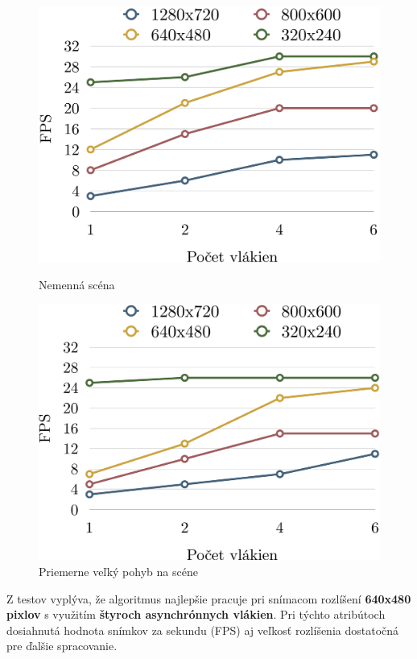 \begin{figure}[H]
  \centering
  \begin{minipage}[b]{0.49\textwidth}
    \includegraphics[width=\textwidth]{images/substractorCalm}
    \caption{Nemenná scéna}
  \end{minipage}
  \hfill
  \begin{minipage}[b]{0.49\textwidth}
    \includegraphics[width=\textwidth]{images/substractorNormal}
    \caption{Priemerne veľký pohyb na scéne}
  \end{minipage}
\end{figure}

Z testov vyplýva, že algoritmus najlepšie pracuje pri snímacom rozlíšení \textbf{640x480 pixlov} s využitím \textbf{štyroch asynchrónnych vlákien}. Pri týchto atribútoch dosiahnutá hodnota snímkov za sekundu (FPS) aj veľkosť rozlíšenia dostatočná pre ďalšie spracovanie. 



